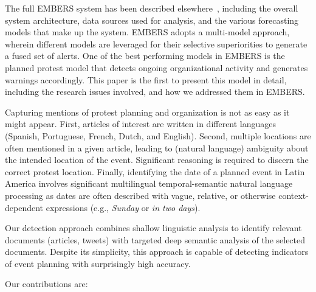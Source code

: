 \documentclass[letterpaper]{article}
\begin{document}
The full EMBERS system has been described elsewhere~\cite{emberskdd,DBLP:conf/bigdataconf/DoyleKSAZLMZLBKFR14}, including
the overall system architecture, data sources used for analysis, and the
various forecasting models that make up the system. EMBERS adopts a multi-model approach,
wherein different models are leveraged for their selective superiorities
to generate a fused set of alerts. One of the
best performing models in EMBERS is the planned protest model that detects
ongoing organizational activity and generates warnings accordingly. This paper
is the first to present this model in detail, including the 
research issues involved, and how we addressed them in EMBERS.

Capturing mentions of protest planning and organization is not as easy
as it might appear. First, articles of interest are written in different
languages (Spanish, Portuguese, French, Dutch, and English).  Second,
multiple locations are often mentioned in a given article, leading to
(natural language) ambiguity about the intended location of the event.
Significant reasoning is required to discern the correct protest
location.  Finally, identifying the date of a planned event in Latin
America involves significant multilingual temporal-semantic natural
language processing as dates are often described with vague, relative,
or otherwise context-dependent expressions (e.g., {\em Sunday} or {\em
in two days}).


Our detection approach combines shallow linguistic analysis to identify
relevant documents (articles, tweets) with targeted deep semantic
analysis of the selected documents. Despite its simplicity, this
approach is capable of detecting indicators of event planning with
surprisingly high accuracy.

Our contributions are:
\end{document}
